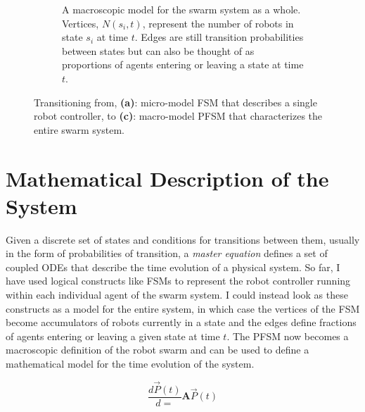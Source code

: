 \documentclass[defaultstyle,12pt]{proposal}
\newcommand{\D}[2]{\frac{d#1}{d#2}}
\begin{document}
\begin{figure}[!tb]
\begin{subfigure}[t]{.4\textwidth}
	\caption{A macroscopic model for the swarm system as a whole. Vertices, $N(s_i, t)$, represent the number of robots in state $s_i$ at time $t$. Edges are still transition probabilities between states but can also be thought of as proportions of agents entering or leaving a state at time $t$.}\label{fig:pfsmmacro}
	\end{subfigure}
\caption{Transitioning from, \textbf{(a)}: micro-model FSM that describes a single robot controller, to \textbf{(c)}: macro-model PFSM that characterizes the entire swarm system.}\label{fig:allfsm}
\end{figure}

\section{Mathematical Description of the System}
Given a discrete set of states and conditions for transitions between them, usually in the form of probabilities of transition, a \emph{master equation} defines a set of coupled ODEs that describe the time evolution of a physical system. So far, I have used logical constructs like FSMs to represent the robot controller running within each individual agent of the swarm system. I could instead look as these constructs as a model for the entire system, in which case the vertices of the FSM become accumulators of robots currently in a state and the edges define fractions of agents entering or leaving a given state at time $t$. The PFSM now becomes a macroscopic definition of the robot swarm and can be used to define a mathematical model for the time evolution of the system.

\begin{equation}
\D{\vec{P}(t)} = \mathbf{A}\vec{P}(t)\label{eq:firstmaster}
\end{equation}
\end{document}
